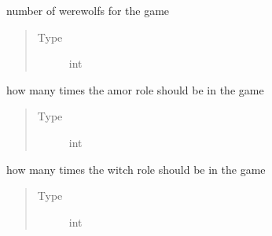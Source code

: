 \documentclass[letterpaper,10pt,english]{sphinxmanual}
\begin{document}
\begin{fulllineitems}

\begin{fulllineitems}
\label{\detokenize{chatwolf:chatwolf.game.Game.num_werewolfs}}
number of werewolfs for the game
\begin{quote}\begin{description}
\item[{Type}] \leavevmode
int

\end{description}\end{quote}

\end{fulllineitems}


\begin{fulllineitems}
\label{\detokenize{chatwolf:chatwolf.game.Game.num_amor}}
how many times the amor role should be in the game
\begin{quote}\begin{description}
\item[{Type}] \leavevmode
int

\end{description}\end{quote}

\end{fulllineitems}


\begin{fulllineitems}
\label{\detokenize{chatwolf:chatwolf.game.Game.num_witch}}
how many times the witch role should be in the game
\begin{quote}\begin{description}
\item[{Type}] \leavevmode
int

\end{description}\end{quote}

\end{fulllineitems}



\end{fulllineitems}
\end{document}
